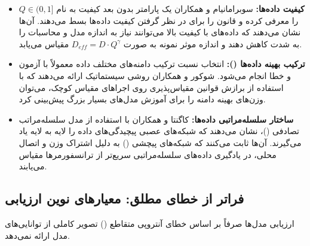 \begin{itemize}
    \item \textbf{کیفیت داده‌ها:} سوبرامانیام و همکاران \cite{subramanyam2026scaling} یک پارامتر بدون بعد کیفیت به نام $Q \in (0, 1]$ را معرفی کرده و قانون  را برای در نظر گرفتن کیفیت داده‌ها بسط می‌دهند. آن‌ها نشان می‌دهند که داده‌های با کیفیت بالا می‌توانند نیاز به اندازه مدل و محاسبات را به شدت کاهش دهند و اندازه موثر نمونه به صورت $D_{eff} = D \cdot Q^\gamma$ مقیاس می‌یابد.
    
    \item \textbf{ترکیب بهینه داده‌ها ():} انتخاب نسبت ترکیب دامنه‌های مختلف داده معمولاً با آزمون و خطا انجام می‌شود. شوکور و همکاران \cite{shukor2025scaling} روشی سیستماتیک ارائه می‌دهند که با استفاده از برازش قوانین مقیاس‌پذیری روی اجراهای مقیاس کوچک، می‌توان وزن‌های بهینه دامنه را برای آموزش مدل‌های بسیار بزرگ پیش‌بینی کرد.
    
    \item \textbf{ساختار سلسله‌مراتبی داده‌ها:} کاگنتا و همکاران \cite{cagnetta2025scaling} با استفاده از مدل سلسله‌مراتب تصادفی ()، نشان می‌دهند که شبکه‌های عصبی پیچیدگی‌های داده را لایه به لایه یاد می‌گیرند. آن‌ها ثابت می‌کنند که شبکه‌های پیچشی () به دلیل اشتراک وزن و اتصال محلی، در یادگیری داده‌های سلسله‌مراتبی سریع‌تر از ترانسفورمرها مقیاس می‌یابند.
\end{itemize}

\subsection{فراتر از خطای مطلق: معیارهای نوین ارزیابی}
ارزیابی مدل‌ها صرفاً بر اساس خطای آنتروپی متقاطع () تصویر کاملی از توانایی‌های مدل ارائه نمی‌دهد.

